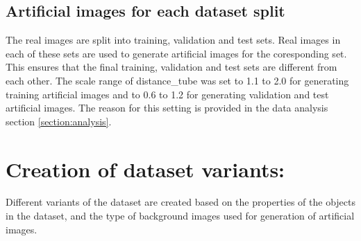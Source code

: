 \subsection{Artificial images for each dataset split}
The real images are split into training, validation and test sets. Real images in each of these sets are used to generate artificial images for the coresponding set. This ensures that the final training, validation and test sets are different from each other. The scale range of distance\_tube was set to 1.1 to 2.0 for generating training artificial images and to 0.6 to 1.2 for generating validation and test artificial images. The reason for this setting is provided in the data analysis section \ref{section:analysis}.

\section{Creation of dataset variants:}
Different variants of the dataset are created based on the properties of the objects in the dataset, and the type of  background images used for generation of artificial images.
